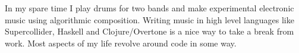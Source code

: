 
\begin{cvparagraph}
In my spare time I play drums for two bands and make experimental electronic music using algorithmic composition. Writing music in high level languages like Supercollider, Haskell and Clojure/Overtone is a nice way to take a break from work. Most aspects of my life revolve around code in some way.
\end{cvparagraph}


